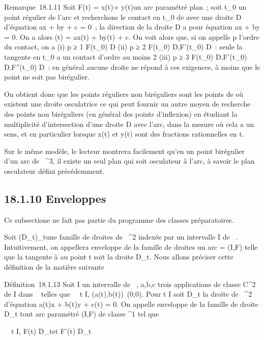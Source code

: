 \documentclass[]{article}
\begin{document}
Remarque~18.1.11 Soit F(t) = x(t)\vec\imath +
y(t) un arc paramétré plan~; soit t_0
un point régulier de l'arc et recherchons le contact en t_0 de
\Gamma avec une droite D d'équation ax + by + c = 0~; la direction
\vecD de la droite D a pour équation ax + by = 0. On
a alors \phi(t) = ax(t) + by(t) + c. On voit alors que, si on appelle p
l'ordre du contact, on a (i) p ≥ 1 \Leftrightarrow
F(t_0) \in D (ii) p ≥ 2 \Leftrightarrow
F(t_0) \in D,F'(t_0) \in\vec D~: seule
la tangente en t_0 a un contact d'ordre au moins 2 (iii) p ≥ 3
\Leftrightarrow F(t_0) \in D,F'(t_0)
\in\vec D,F''(t_0) \in\vec
D~: en général aucune droite ne répond à ces exigences, à moins que le
point ne soit pas birégulier.

On obtient donc que les points réguliers non biréguliers sont les points
de \Gamma où existent une droite osculatrice ce qui peut fournir un autre
moyen de recherche des points non biréguliers (en général des points
d'inflexion) en étudiant la multiplicité d'intersection d'une droite D
avec l'arc, dans la mesure où cela a un sens, et en particulier lorsque
x(t) et y(t) sont des fractions rationnelles en t.

Sur le même modèle, le lecteur montrera facilement qu'en un point
birégulier d'un arc de ~^3, il existe un seul plan qui soit
osculateur à l'arc, à savoir le plan osculateur défini précédemment.

\subsection{18.1.10 Enveloppes}

Ce subsectione ne fait pas partie du programme des classes préparatoires.

Soit (D_t)_t\inI une famille de droites de
~^2 indexée par un intervalle I de ~. Intuitivement, on
appellera enveloppe de la famille de droites un arc \Gamma = (I,F) telle que
la tangente à \Gamma au point t soit la droite D_t. Nous allons
préciser cette définition de la matière suivante

Définition~18.1.13 Soit I un intervalle de ~, a,b,c trois applications
de classe C^2 de I dans ~ telles que
\forall~~t \in I,
(a(t),b(t))\neq~(0,0). Pour t \in I soit
D_t la droite de ~^2 d'équation a(t)x + b(t)y + c(t)
= 0. On appelle enveloppe de la famille de droite D_t tout arc
paramétré (I,F) de classe ^1 tel que

\forall~~t \in I, F(t) \in
D_t\text et F'(t)
\in\overrightarrow D_t
\end{document}
